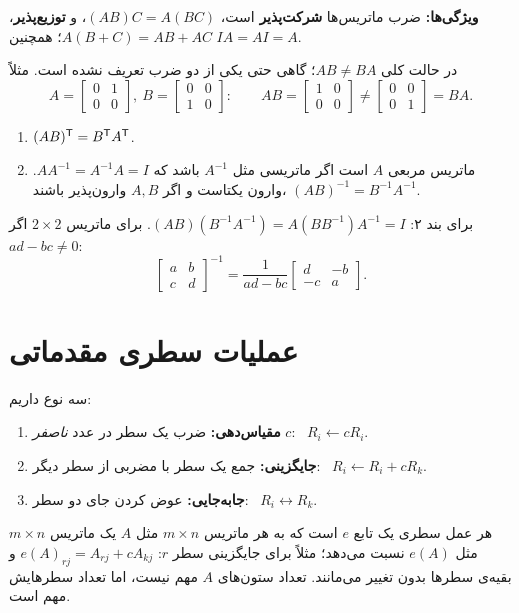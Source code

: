 \textbf{ویژگی‌ها:} ضرب ماتریس‌ها \textbf{شرکت‌پذیر} است، $(AB)C=A(BC)$، و \textbf{توزیع‌پذیر}، $A(B+C)=AB+AC$؛ همچنین $IA=AI=A$.

\begin{warning}
در حالت کلی $AB\neq BA$؛ گاهی حتی یکی از دو ضرب تعریف نشده است. مثلاً
\[
A=\begin{bmatrix}0&1\\0&0\end{bmatrix},\ B=\begin{bmatrix}0&0\\1&0\end{bmatrix}:\qquad
AB=\begin{bmatrix}1&0\\0&0\end{bmatrix}\neq\begin{bmatrix}0&0\\0&1\end{bmatrix}=BA .
\]
\end{warning}

\begin{theorem}\label{thm:transpose}\label{thm:inverse-props}
\begin{enumerate}
  \item $(AB)^{\mathsf{T}}=B^{\mathsf{T}} A^{\mathsf{T}}$.
  \item ماتریس مربعی $A$  است اگر ماتریسی مثل $A^{-1}$ باشد که $AA^{-1}=A^{-1}A=I$. وارون  یکتاست و اگر $A,B$ وارون‌پذیر باشند، $(AB)^{-1}=B^{-1}A^{-1}$.
\end{enumerate}
\end{theorem}
برای بند ۲: $(AB)(B^{-1}A^{-1})=A(BB^{-1})A^{-1}=I$. برای ماتریس $2\times2$ اگر $ad-bc\neq0$: 
\[
\begin{bmatrix}a&b\\c&d\end{bmatrix}^{-1}=\frac{1}{ad-bc}\begin{bmatrix}d&-b\\-c&a\end{bmatrix}.
\]


\section{عملیات سطری مقدماتی}

\begin{definition}
سه نوع  داریم:
\begin{enumerate}
  \item \textbf{مقیاس‌دهی:} ضرب یک سطر در عدد \emph{ناصفر} $c$: \ $R_i\leftarrow cR_i$.
  \item \textbf{جایگزینی:} جمع یک سطر با مضربی از سطر دیگر: \ $R_i\leftarrow R_i+cR_k$.
  \item \textbf{جابه‌جایی:} عوض کردن جای دو سطر: \ $R_i\leftrightarrow R_k$.
\end{enumerate}
هر عمل سطری یک تابع $e$ است که به هر ماتریس $m\times n$ مثل $A$ یک ماتریس $m\times n$ مثل $e(A)$ نسبت می‌دهد؛ مثلاً برای جایگزینی سطر $r$: $e(A)_{rj}=A_{rj}+cA_{kj}$ و بقیه‌ی سطرها بدون تغییر می‌مانند. تعداد ستون‌های $A$ مهم نیست، اما تعداد سطرهایش مهم است.
\end{definition}

